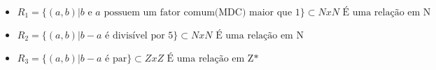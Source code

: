 \begin{question}
	\begin{itemize}
		\item $R_1 = \{ (a,b) | b\text{ e }a \text{ possuem um fator comum(MDC) maior que 1} \}  \subset NxN \text{ É uma relação em N }$
		\item $R_2= \{ (a,b) | b - a \text{ é divisível por 5} \}  \subset NxN \text{ É uma relação em N }$
		\item $R_3 = \{ (a,b) | b -a \text{ é par} \} \subset ZxZ \text{ É uma relação em Z* }$
	\end{itemize}
\end{question}